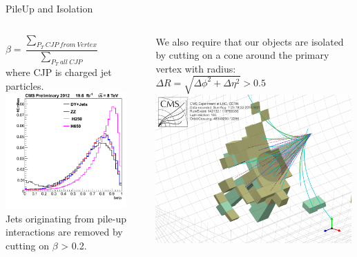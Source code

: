 \begin{frame}{PileUp and Isolation}
\begin{columns}
\begin{column}{0.5\textwidth}
\begin{center}
$\beta = \dfrac{\sum_{P_T\ CJP\ from\ Vertex}}{\sum_{P_T\ all\ CJP}}$\\
\footnotesize
 where CJP is charged jet particles.
\includegraphics[width=0.89\textwidth]{images/beta.png}\\
Jets originating from pile-up interactions are removed by cutting on $\beta$ > 0.2.
\end{center}
\end{column}
\begin{column}{0.5\textwidth}
\begin{center}
{\footnotesize We also require that our objects are isolated by cutting on a cone around the primary vertex with radius:}\\
$\Delta R = \sqrt{\Delta \phi^2 + \Delta \eta^2} > 0.5$
\includegraphics[width=0.99\textwidth]{images/JetConeAll-1024x778.png}\\

\end{center}
\end{column}
\end{columns}
\end{frame}
